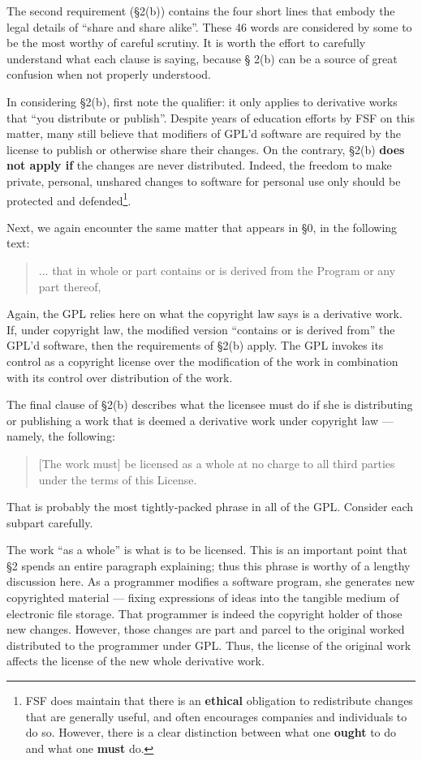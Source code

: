 \documentclass[12pt]{report}
\begin{document}
\medskip

The second requirement (\S 2(b)) contains the four short lines that embody
the legal details of ``share and share alike''.  These 46 words are
considered by some to be the most worthy of careful scrutiny.  It is worth
the effort to carefully understand what each clause is saying, because \S
2(b) can be a source of great confusion when not properly understood.

In considering \S 2(b), first note the qualifier: it only applies to
derivative works that ``you distribute or publish''.  Despite years of
education efforts by FSF on this matter, many still believe that modifiers
of GPL'd software are required by the license to publish or otherwise
share their changes.  On the contrary, \S 2(b) {\bf does not apply if} the
changes are never distributed.  Indeed, the freedom to make private,
personal, unshared changes to software for personal use only should be
protected and defended\footnote{FSF does maintain that there is an {\bf
    ethical} obligation to redistribute changes that are generally useful,
  and often encourages companies and individuals to do so.  However, there
  is a clear distinction between what one {\bf ought} to do and what one
  {\bf must} do.}.

Next, we again encounter the same matter that appears in \S 0, in the
following text:
\begin{quote}
... that in whole or part contains or is derived from the Program or any
  part thereof,
\end{quote}
Again, the GPL relies here on what the copyright law says is a derivative
work.  If, under copyright law, the modified version ``contains or is
derived from'' the GPL'd software, then the requirements of \S 2(b)
apply.  The GPL invokes its control as a copyright license over the
modification of the work in combination with its control over distribution
of the work.

The final clause of \S 2(b) describes what the licensee must do if she is
distributing or publishing a work that is deemed a derivative work under
copyright law --- namely, the following:
\begin{quote}
[The work must] be licensed as a whole at no charge to all third parties
under the terms of this License.
\end{quote}
That is probably the most tightly-packed phrase in all of the GPL\@.
Consider each subpart carefully.

The work ``as a whole'' is what is to be licensed.  This is an important
point that \S 2 spends an entire paragraph explaining; thus this phrase is
worthy of a lengthy discussion here.  As a programmer modifies a software
program, she generates new copyrighted material --- fixing expressions of
ideas into the tangible medium of electronic file storage.  That
programmer is indeed the copyright holder of those new changes.  However,
those changes are part and parcel to the original worked distributed to
the programmer under GPL\@.  Thus, the license of the original work
affects the license of the new whole derivative work.
\end{document}
